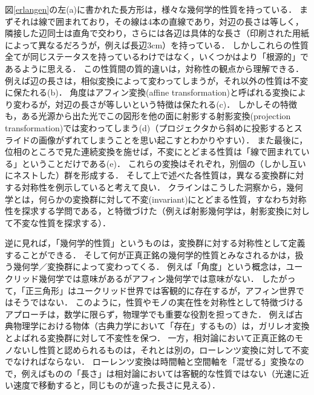 \documentclass[11pt,a4paper]{jsarticle}
\begin{document}
図\ref{erlangen}の左(a)に書かれた長方形は，様々な幾何学的性質を持っている．
まずそれは線で囲まれており，その線は4本の直線であり，対辺の長さは等しく，隣接した辺同士は直角で交わり，さらには各辺は具体的な長さ（印刷された用紙によって異なるだろうが，例えば長辺3cm）を持っている．
しかしこれらの性質全てが同じステータスを持っているわけではなく，いくつかはより「根源的」であるように思える．
この性質間の質的違いは，対称性の観点から理解できる．
例えば辺の長さは，相似変換によって変わってしまうが，それ以外の性質は不変に保たれる(b)．
角度はアフィン変換(affine transformation)と呼ばれる変換により変わるが，対辺の長さが等しいという特徴は保たれる(c)．
しかしその特徴も，ある光源から出た光でこの図形を他の面に射影する射影変換(projection transformation)では変わってしまう(d)（プロジェクタから斜めに投影するとスライドの画像がずれてしまうことを思い起こすとわかりやすい）．
また最後に，位相のところで見た連続変換を施せば，不変にとどまる性質は「線で囲まれている」ということだけである(e)．
これらの変換はそれぞれ，別個の（しかし互いにネストした）群を形成する．
そして上で述べた各性質は，異なる変換群に対する対称性を例示していると考えて良い．
クラインはこうした洞察から，幾何学とは，何らかの変換群に対して不変(invariant)にとどまる性質，すなわち対称性を探求する学問である，と特徴づけた（例えば射影幾何学は，射影変換に対して不変な性質を探求する）．

逆に見れば，「幾何学的性質」というものは，変換群に対する対称性として定義することができる．
そして何が正真正銘の幾何学的性質とみなされるかは，扱う幾何学／変換群によって変わってくる．
例えば「角度」という概念は，ユークリッド幾何学では意味があるがアフィン幾何学では意味がない．
したがって，「正三角形」はユークリッド世界では客観的に存在するが，アフィン世界ではそうではない．
このように，性質やモノの実在性を対称性として特徴づけるアプローチは，数学に限らず，物理学でも重要な役割を担ってきた．
例えば古典物理学における物体（古典力学において「存在」するもの）は，ガリレオ変換とよばれる変換群に対して不変性を保つ．
一方，相対論において正真正銘のモノないし性質と認められるものは，それとは別の，ローレンツ変換に対して不変でなければならない．
ローレンツ変換は時間軸と空間軸を「混ぜる」変換なので，例えばものの「長さ」は相対論においては客観的な性質ではない（光速に近い速度で移動すると，同じものが違った長さに見える）．
\end{document}
